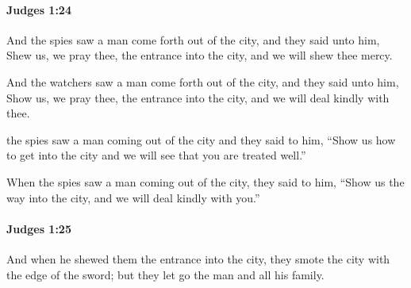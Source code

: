 		\paragraph{Judges 1:24} %
			\label{JUDGES-1-24}

			And the spies saw a man come forth out of the city, and they said unto him, Shew us, we pray thee, the entrance into the city, and we will shew thee mercy.

			\begin{versebox}
					\item[BHS] 
					\item[ASV] And the watchers saw a man come forth out of the city, and they said unto him, Show us, we pray thee, the entrance into the city, and we will deal kindly with thee.
					\item[NIV] the spies saw a man coming out of the city and they said to him, “Show us how to get into the city and we will see that you are treated well.”
					\item[NRSV] When the spies saw a man coming out of the city, they said to him, “Show us the way into the city, and we will deal kindly with you.”
			\end{versebox}

		\paragraph{Judges 1:25} %
			\label{JUDGES-1-25}

			And when he shewed them the entrance into the city, they smote the city with the edge of the sword; but they let go the man and all his family.

